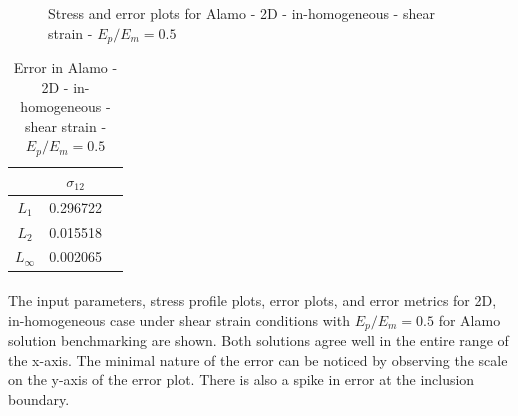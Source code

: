 \documentclass[12pt, a4paper]{report}
\begin{document}
\begin{figure}[htbp]
  \centering
  \hfill
  \caption{Stress and error plots for Alamo - 2D - in-homogeneous - shear strain - $E_p/E_m = 0.5$}
\end{figure}

\begin{table}[H]
    \centering
    \begin{tabular}{|c|c|c|}
        \hline
        &\textbf{$\sigma_{12}$} \\
        \hline
        $L_1$ & 0.296722 \\
        \hline
        $L_2$ & 0.015518  \\
        \hline 
        $L_\infty$ & 0.002065 \\
        \hline
    \end{tabular}
    \caption{Error in Alamo - 2D - in-homogeneous - shear strain - $E_p/E_m = 0.5$}
\end{table}

\paragraph{}
The input parameters, stress profile plots, error plots, and error metrics for 2D, in-homogeneous case under shear strain conditions with $E_p/E_m = 0.5$ for Alamo solution benchmarking are shown. Both solutions agree well in the entire range of the x-axis. The minimal nature of the error can be noticed by observing the scale on the y-axis of the error plot. There is also a spike in error at the inclusion boundary.
\end{document}
